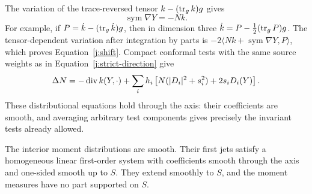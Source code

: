 The variation of the trace-reversed tensor
\(k-(\operatorname{tr}_gk)g\) gives
\begin{equation}
\label{j:shift}
 \operatorname{sym}\nabla Y=-Nk.
\end{equation}
For example, if \(P=\dot k-(\operatorname{tr}_g\dot k)g\), then in dimension three
\(\dot k=P-\tfrac12(\operatorname{tr}_gP)g\). The tensor-dependent variation after
integration by parts is
\(-2\langle Nk+\operatorname{sym}\nabla Y,P\rangle\), which proves
Equation~\eqref{j:shift}.
Compact conformal tests with the same source weights as in
Equation~\eqref{j:strict-direction} give
\begin{equation}
\label{j:lapse}
 \Delta N=-\operatorname{div} k(Y,\cdot)
   +\sum_i h_i\left[N(|D_i|^2+s_i^2)+2s_iD_i(Y)\right].
\end{equation}
These distributional equations hold through the axis: their coefficients
are smooth, and averaging arbitrary test components gives precisely the
invariant tests already allowed.

\begin{lemma}
\label{j:regularity}
The interior moment distributions are smooth. Their first jets satisfy
a homogeneous linear first-order system with coefficients smooth through
the axis and one-sided smooth up to \(S\). They extend smoothly to \(S\),
and the moment measures have no part supported on \(S\).
\end{lemma}

